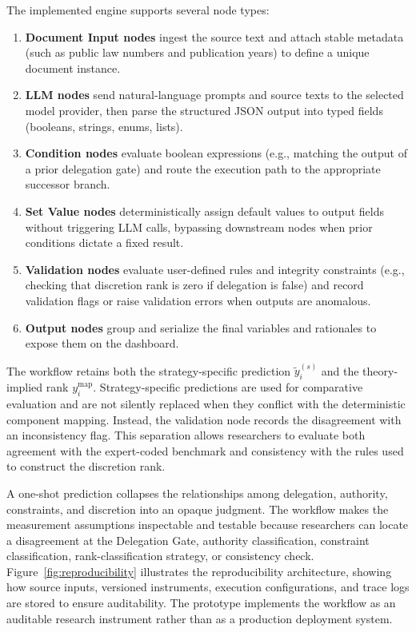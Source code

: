 \documentclass[runningheads]{llncs}
\begin{document}
 
 The implemented engine supports several node types:
\begin{enumerate}[nosep]
  \item \textbf{Document Input nodes} ingest the source text and attach stable metadata (such as public law numbers and publication years) to define a unique document instance.
  \item \textbf{LLM nodes} send natural-language prompts and source texts to the selected model provider, then parse the structured JSON output into typed fields (booleans, strings, enums, lists).
  \item \textbf{Condition nodes} evaluate boolean expressions (e.g., matching the output of a prior delegation gate) and route the execution path to the appropriate successor branch.
  \item \textbf{Set Value nodes} deterministically assign default values to output fields without triggering LLM calls, bypassing downstream nodes when prior conditions dictate a fixed result.
  \item \textbf{Validation nodes} evaluate user-defined rules and integrity constraints (e.g., checking that discretion rank is zero if delegation is false) and record validation flags or raise validation errors when outputs are anomalous.
  \item \textbf{Output nodes} group and serialize the final variables and rationales to expose them on the dashboard.
\end{enumerate}

The workflow retains both the strategy-specific prediction \(\tilde y_i^{(s)}\) and the theory-implied rank \(y_i^{\mathrm{map}}\). Strategy-specific predictions are used for comparative evaluation and are not silently replaced when they conflict with the deterministic component mapping. Instead, the validation node records the disagreement with an inconsistency flag. This separation allows researchers to evaluate both agreement with the expert-coded benchmark and consistency with the rules used to construct the discretion rank.

A one-shot prediction collapses the relationships among delegation, authority, constraints, and discretion into an opaque judgment. The workflow makes the measurement assumptions inspectable and testable because researchers can locate a disagreement at the Delegation Gate, authority classification, constraint classification, rank-classification strategy, or consistency check. Figure~\ref{fig:reproducibility} illustrates the reproducibility architecture, showing how source inputs, versioned instruments, execution configurations, and trace logs are stored to ensure auditability.  The prototype implements the workflow as an auditable research instrument rather than as a production deployment system.
\end{document}
